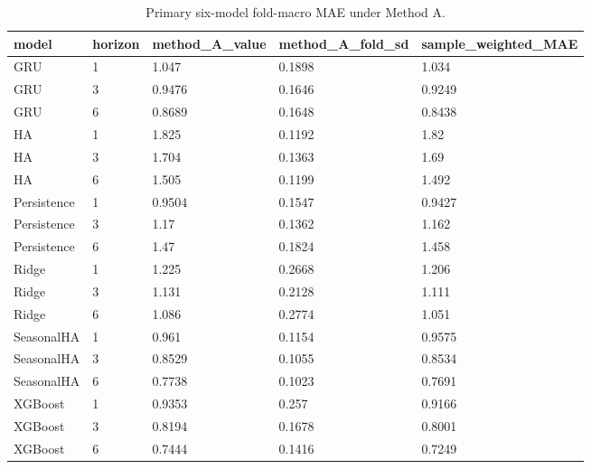 \begin{table}[!htbp]
\centering
\caption{Primary six-model fold-macro MAE under Method A.}
\begin{tabular}{lllll}
\hline
model & horizon & method\_A\_value & method\_A\_fold\_sd & sample\_weighted\_MAE \\ 
\hline
GRU & 1 & 1.047 & 0.1898 & 1.034 \\
GRU & 3 & 0.9476 & 0.1646 & 0.9249 \\
GRU & 6 & 0.8689 & 0.1648 & 0.8438 \\
HA & 1 & 1.825 & 0.1192 & 1.82 \\
HA & 3 & 1.704 & 0.1363 & 1.69 \\
HA & 6 & 1.505 & 0.1199 & 1.492 \\
Persistence & 1 & 0.9504 & 0.1547 & 0.9427 \\
Persistence & 3 & 1.17 & 0.1362 & 1.162 \\
Persistence & 6 & 1.47 & 0.1824 & 1.458 \\
Ridge & 1 & 1.225 & 0.2668 & 1.206 \\
Ridge & 3 & 1.131 & 0.2128 & 1.111 \\
Ridge & 6 & 1.086 & 0.2774 & 1.051 \\
SeasonalHA & 1 & 0.961 & 0.1154 & 0.9575 \\
SeasonalHA & 3 & 0.8529 & 0.1055 & 0.8534 \\
SeasonalHA & 6 & 0.7738 & 0.1023 & 0.7691 \\
XGBoost & 1 & 0.9353 & 0.257 & 0.9166 \\
XGBoost & 3 & 0.8194 & 0.1678 & 0.8001 \\
XGBoost & 6 & 0.7444 & 0.1416 & 0.7249 \\
\hline
\end{tabular}
\end{table}

